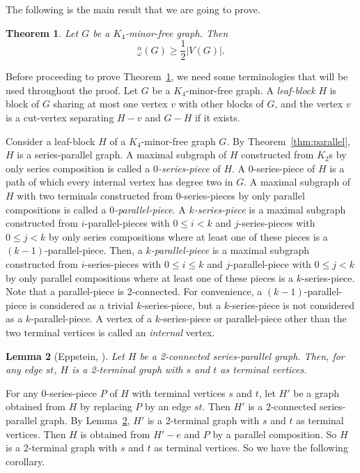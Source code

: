 \documentclass{article}
\newtheorem{thm}{Theorem}[section]
\newtheorem{lem}[thm]{Lemma}
\newcommand{\idq}{{}^{\alpha}_{\omega}}
\begin{document}
The following is the main result that we are going to prove.

\begin{thm}\label{thm:lower}
    Let $G$ be a $K_4$-minor-free graph. Then
    \[\idq(G)\ge  \frac 1 2 |V(G)|.\]
\end{thm}


Before proceeding to prove Theorem~\ref{thm:lower}, we need some terminologies that will be used throughout the proof. Let $G$ be a $K_4$-minor-free graph.  %
A {\em leaf-block} $H$ is block of $G$ sharing at most one vertex $v$ with other blocks of $G$, and the vertex $v$ is a cut-vertex separating $H-v$ and $G-H$ if it exists. 

Consider a leaf-block $H$ of a $K_4$-minor-free graph $G$. By Theorem~\ref{thm:parallel}, $H$ is a series-parallel graph. A maximal subgraph of $H$ constructed from $K_2$s by only series composition is called a {\em $0$-series-piece} of $H$. A $0$-series-piece of $H$ is a path of which every internal vertex has degree two in $G$. A maximal subgraph of $H$ with two terminals constructed from $0$-series-pieces by only parallel compositions is called a {\em $0$-parallel-piece}. A {\em $k$-series-piece} is a maximal subgraph constructed from $i$-parallel-pieces with $0\le i< k$ and $j$-series-pieces with $0\le j<k$ by only series compositions where at least one of these pieces is a $(k-1)$-parallel-piece. Then, a {\em $k$-parallel-piece} is a maximal subgraph constructed from $i$-series-pieces with $0\le i\le k$ and $j$-parallel-piece with $0\le j<k$ by only parallel compositions where at least one of these pieces is a $k$-series-piece. Note that a parallel-piece is 2-connected. For convenience, a $(k-1)$-parallel-piece is considered as a trivial $k$-series-piece, but a $k$-series-piece is not considered as a $k$-parallel-piece. A vertex of a $k$-series-piece or parallel-piece other than the two terminal vertices is called an {\em internal} vertex. %


\begin{lem}[Eppstein, \cite{DE}]\label{lem:terminal}
Let $H$ be a 2-connected series-parallel graph. Then, for any edge $st$, $H$ is a 2-terminal graph with $s$ and $t$ as terminal vertices.
\end{lem}

For any $0$-series-piece $P$ of $H$ with terminal vertices $s$ and $t$, let $H'$ be a graph obtained from $H$ by replacing $P$ by an edge $st$. Then $H'$ is a 2-connected series-parallel graph. By Lemma~\ref{lem:terminal}, $H'$ is a 2-terminal graph with $s$ and $t$ as terminal vertices. Then $H$ is obtained from $H'-e$ and $P$ by a parallel composition. So $H$ is a 2-terminal graph with $s$ and $t$ as terminal vertices. So we have the following corollary.
\end{document}

